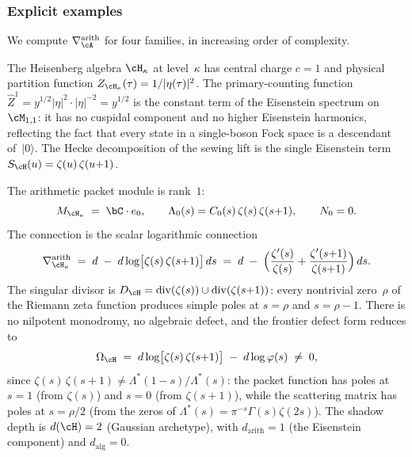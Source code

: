 \subsubsection*{Explicit examples}%
\label{subsub:packet-connection-examples}%

We compute $\nabla_\cA^{\mathrm{arith}}$ for four families, in
increasing order of complexity.

\begin{example}%
\label{ex:packet-heisenberg}%
%
The Heisenberg algebra $\cH_\kappa$ at level~$\kappa$ has
central charge $c = 1$ and physical partition function
$Z_{\cH_\kappa}(\tau) = 1/\lvert\eta(\tau)\rvert^2$.
The primary-counting function
$\widehat{Z}^1 = y^{1/2}\lvert\eta\rvert^{2}\cdot
\lvert\eta\rvert^{-2} = y^{1/2}$
is the constant term of the Eisenstein spectrum
on~$\cM_{1,1}$: it has no cuspidal component and no
higher Eisenstein harmonics, reflecting the fact that
every state in a single-boson Fock space is
a descendant of~$|0\rangle$.
The Hecke decomposition of the sewing lift is the single
Eisenstein term $S_\cH(u) = \zeta(u)\,\zeta(u{+}1)$.

The arithmetic packet module is rank~$1$:
\[
 M_{\cH_\kappa}
 \;=\;
 \bC\cdot e_0,
 \qquad
 \Lambda_0(s) = C_0(s)\,\zeta(s)\,\zeta(s{+}1),
 \qquad
 N_0 = 0.
\]
The connection is the scalar logarithmic connection
\begin{equation}\label{eq:packet-heisenberg}
 \nabla_{\cH_\kappa}^{\mathrm{arith}}
 \;=\;
 d \;-\; d\log\bigl[\zeta(s)\,\zeta(s{+}1)\bigr]\,ds
 \;=\;
 d \;-\; \Bigl(
 \frac{\zeta'(s)}{\zeta(s)}
 + \frac{\zeta'(s{+}1)}{\zeta(s{+}1)}
 \Bigr)\,ds.
\end{equation}
The singular divisor is
$D_{\cH} = \operatorname{div}(\zeta(s))
\cup \operatorname{div}(\zeta(s{+}1))$:
every nontrivial zero~$\rho$ of the Riemann zeta function
produces simple poles at $s = \rho$ and $s = \rho - 1$.
There is no nilpotent monodromy, no algebraic defect, and the
frontier defect form reduces to
\[
 \Omega_{\cH}
 \;=\;
 d\log\bigl[\zeta(s)\,\zeta(s{+}1)\bigr]
 \;-\; d\log\varphi(s)
 \;\neq\; 0,
\]
since $\zeta(s)\,\zeta(s{+}1) \ne
\Lambda^*(1{-}s)/\Lambda^*(s)$: the packet function has
poles at $s = 1$ (from $\zeta(s)$) and $s = 0$
(from $\zeta(s{+}1)$), while
the scattering matrix has poles at $s = \rho/2$ (from the
zeros of $\Lambda^*(s) = \pi^{-s}\Gamma(s)\zeta(2s)$).
The shadow depth is $d(\cH) = 2$ (Gaussian archetype), with
$d_{\mathrm{arith}} = 1$ (the Eisenstein component) and
$d_{\mathrm{alg}} = 0$.
\end{example}

